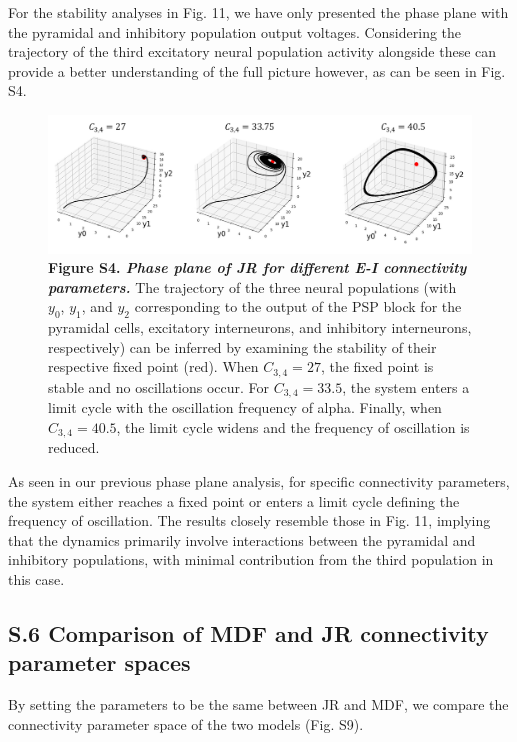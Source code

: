 \documentclass[12pt,twoside]{article}
\begin{document}
For the stability analyses in Fig. 11, we have only presented the phase plane with the pyramidal and inhibitory population output voltages. Considering the trajectory of the third excitatory neural population activity alongside these can provide a better understanding of the full picture however, as can be seen in Fig. S4.


\begin{figure}[H]
    \centering
    \includegraphics[scale=0.5]{Images/Appendix_stab.png}
    \caption*{\textbf{Figure S4.  \textit{Phase plane of JR for different E-I connectivity parameters.}} The trajectory of the three neural populations (with $y_0$, $y_1$, and $y_2$ corresponding to the output of the PSP block for the pyramidal cells, excitatory interneurons, and inhibitory interneurons, respectively) can be inferred by examining the stability of their respective fixed point (red). When $C_{3,4} = 27$, the fixed point is stable and no oscillations occur. For $C_{3,4} = 33.5$, the system enters a limit cycle with the oscillation frequency of alpha. Finally, when $C_{3,4} = 40.5$, the limit cycle widens and the frequency of oscillation is reduced.}     
    \label{fig:Stability3D}
\end{figure}

As seen in our previous phase plane analysis, for specific connectivity parameters, the system either reaches a fixed point or enters a limit cycle defining the frequency of oscillation. The results closely resemble those in Fig. 11, implying that the dynamics primarily involve interactions between the pyramidal and inhibitory populations, with minimal contribution from the third population in this case.

\newpage


\newpage
\subsection*{S.6 Comparison of MDF and JR connectivity parameter spaces}

By setting the parameters to be the same between JR and MDF, we compare the connectivity parameter space of the two models (Fig. S9).
\end{document}
